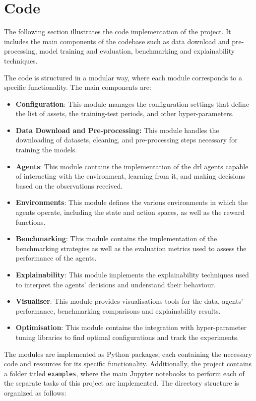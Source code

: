\chapter{Code} \label{app:code}

The following section illustrates the code implementation of the project. It includes the main components of the codebase such as data download and pre-processing, model training and evaluation, benchmarking and explainability techniques. 

The code is structured in a modular way, where each module corresponds to a specific functionality. The main components are:
\begin{itemize}
    \item \textbf{Configuration}: This module manages the configuration settings that define the list of assets, the training-test periods, and other hyper-parameters.
    \item \textbf{Data Download and Pre-processing:} This module handles the downloading of datasets, cleaning, and pre-processing steps necessary for training the models.
    \item \textbf{Agents}: This module contains the implementation of the \acrshort{drl} agents capable of interacting with the environment, learning from it, and making decisions based on the observations received.
    \item \textbf{Environments}: This module defines the various environments in which the agents operate, including the state and action spaces, as well as the reward functions.
    \item \textbf{Benchmarking}: This module contains the implementation of the benchmarking strategies as well as the evaluation metrics used to assess the performance of the agents.
    \item \textbf{Explainability}: This module implements the explainability techniques used to interpret the agents' decisions and understand their behaviour.
    \item \textbf{Visualiser}: This module provides visualisations tools for the data, agents' performance, benchmarking comparisons and explainability results.
    \item \textbf{Optimisation}: This module contains the integration with hyper-parameter tuning libraries to find optimal configurations and track the experiments.
\end{itemize}

The modules are implemented as Python packages, each containing the necessary code and resources for its specific functionality. Additionally, the project contains a folder titled \texttt{examples}, where the main Jupyter notebooks to perform each of the separate tasks of this project are implemented. The directory structure is organized as follows:

